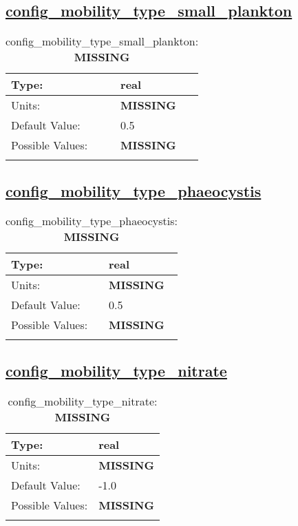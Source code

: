 \subsection[config\_mobility\_type\_small\_plankton]{\hyperref[sec:nm_tab_biogeochemistry]{config\_mobility\_type\_small\_plankton}}
\label{subsec:nm_sec_config_mobility_type_small_plankton}
\begin{center}
\begin{longtable}{| p{2.0in} || p{4.0in} |}
    \hline
    Type: & real \\
    \hline
    Units: & {\bf \color{red} MISSING} \\
    \hline
    Default Value: & 0.5 \\
    \hline
    Possible Values: & {\bf \color{red} MISSING} \\
    \hline
    \caption{config\_mobility\_type\_small\_plankton: {\bf \color{red} MISSING}}
\end{longtable}
\end{center}
\subsection[config\_mobility\_type\_phaeocystis]{\hyperref[sec:nm_tab_biogeochemistry]{config\_mobility\_type\_phaeocystis}}
\label{subsec:nm_sec_config_mobility_type_phaeocystis}
\begin{center}
\begin{longtable}{| p{2.0in} || p{4.0in} |}
    \hline
    Type: & real \\
    \hline
    Units: & {\bf \color{red} MISSING} \\
    \hline
    Default Value: & 0.5 \\
    \hline
    Possible Values: & {\bf \color{red} MISSING} \\
    \hline
    \caption{config\_mobility\_type\_phaeocystis: {\bf \color{red} MISSING}}
\end{longtable}
\end{center}
\subsection[config\_mobility\_type\_nitrate]{\hyperref[sec:nm_tab_biogeochemistry]{config\_mobility\_type\_nitrate}}
\label{subsec:nm_sec_config_mobility_type_nitrate}
\begin{center}
\begin{longtable}{| p{2.0in} || p{4.0in} |}
    \hline
    Type: & real \\
    \hline
    Units: & {\bf \color{red} MISSING} \\
    \hline
    Default Value: & -1.0 \\
    \hline
    Possible Values: & {\bf \color{red} MISSING} \\
    \hline
    \caption{config\_mobility\_type\_nitrate: {\bf \color{red} MISSING}}
\end{longtable}
\end{center}
